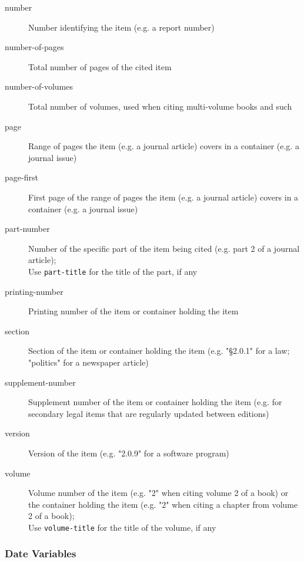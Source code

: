 \begin{description}
  \item[number]
    Number identifying the item (e.g. a report number)

  \item[number-of-pages]
    Total number of pages of the cited item

  \item[number-of-volumes]
    Total number of volumes, used when citing multi-volume books and such

  \item[page]
    Range of pages the item (e.g. a journal article) covers in a container
    (e.g. a journal issue)

  \item[page-first]
    First page of the range of pages the item (e.g. a journal article)
    covers in a container (e.g. a journal issue)

  \item[part-number]
    Number of the specific part of the item being cited (e.g. part 2 of a
    journal article);\\
    Use \texttt{part-title} for the title of the part, if any

  \item[printing-number]
    Printing number of the item or container holding the item

  \item[section]
    Section of the item or container holding the item (e.g. "§2.0.1" for a
    law; "politics" for a newspaper article)

  \item[supplement-number]
    Supplement number of the item or container holding the item (e.g. for
    secondary legal items that are regularly updated between editions)

  \item[version]
    Version of the item (e.g. "2.0.9" for a software program)

  \item[volume]
    Volume number of the item (e.g. "2" when citing volume 2 of a book) or
    the container holding the item (e.g. "2" when citing a chapter from
    volume 2 of a book);\\
    Use \texttt{volume-title} for the title of the volume, if any
    \end{description}

\hypertarget{date-variables}{%
\subsubsection{Date Variables}\label{date-variables}}

